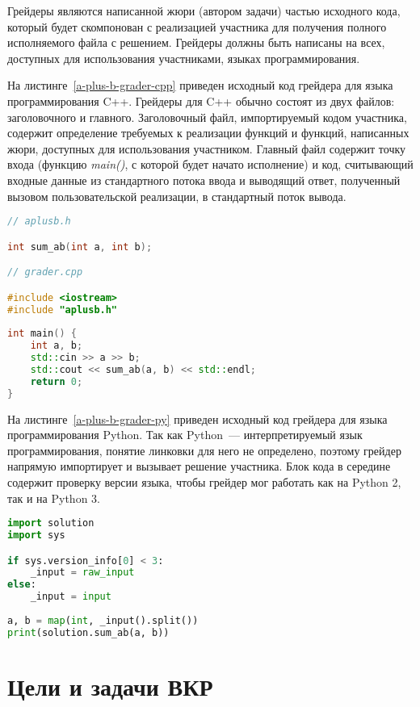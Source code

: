 \documentclass[times,specification,annotation]{style/itmo-student-thesis/itmo-student-thesis}
\begin{document}
Грейдеры являются написанной жюри (автором задачи) частью исходного кода, который будет скомпонован с реализацией участника для получения полного исполняемого файла с решением. Грейдеры должны быть написаны на всех, доступных для использования участниками, языках программирования. 

На листинге~\ref{a-plus-b-grader-cpp} приведен исходный код грейдера для языка программирования C++. Грейдеры для C++ обычно состоят из двух файлов: заголовочного и главного. Заголовочный файл, импортируемый кодом участника, содержит определение требуемых к реализации функций и функций, написанных жюри, доступных для использования участником. Главный файл содержит точку входа (функцию \textit{main()}, с которой будет начато исполнение) и код, считывающий входные данные из стандартного потока ввода и выводящий ответ, полученный вызовом пользовательской реализации, в стандартный поток вывода.

\begin{lstlisting}[float=!h,caption={Пример грейдера для языка C++},label={a-plus-b-grader-cpp},language=c++]
// aplusb.h

int sum_ab(int a, int b);

// grader.cpp

#include <iostream>
#include "aplusb.h"
 
int main() {
    int a, b;
    std::cin >> a >> b;
    std::cout << sum_ab(a, b) << std::endl;
    return 0;
}
\end{lstlisting}

На листинге~\ref{a-plus-b-grader-py} приведен исходный код грейдера для языка программирования Python. Так как Python~--- интерпретируемый язык программирования, понятие линковки для него не определено, поэтому грейдер напрямую импортирует и вызывает решение участника. Блок кода в середине содержит проверку версии языка, чтобы грейдер мог работать как на Python 2, так и на Python 3.

\begin{lstlisting}[float=!h,caption={Пример грейдера для языка Python},label={a-plus-b-grader-py},language=python]
import solution
import sys

if sys.version_info[0] < 3:
    _input = raw_input
else:
    _input = input
 
a, b = map(int, _input().split())
print(solution.sum_ab(a, b))
\end{lstlisting}

\section{Цели и задачи ВКР}
\end{document}
